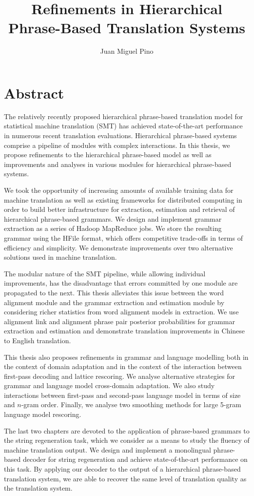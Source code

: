\documentclass[oneside, 12pt]{article}
\title{Refinements in Hierarchical Phrase-Based Translation Systems}
\author{Juan Miguel Pino}
\date{}
\begin{document}
\maketitle

\vspace{-2.5cm}

\section*{Abstract}

The relatively recently proposed hierarchical phrase-based
translation model for statistical machine translation (SMT)
has achieved state-of-the-art performance
in numerous recent translation evaluations. Hierarchical phrase-based
systems comprise a pipeline of modules with complex interactions.
In this thesis, we propose refinements to the hierarchical
phrase-based model as well as improvements and analyses in various
modules for hierarchical phrase-based systems.

We took the opportunity of increasing amounts of available training
data for machine translation as well as existing frameworks for
distributed computing in order to build better infrastructure
for extraction, estimation and retrieval of hierarchical phrase-based
grammars. We design and implement grammar extraction as a series of
Hadoop MapReduce jobs. We store the resulting grammar using the HFile
format, which
offers competitive trade-offs in terms of efficiency and simplicity.
We demonstrate improvements over two alternative solutions used in
machine translation.

The modular nature of the SMT pipeline, while allowing individual
improvements, has the disadvantage that errors committed by
one module are propagated to the next. This thesis
alleviates this issue between the word alignment module and the
grammar extraction and estimation module by considering richer
statistics from word alignment models in extraction. We use
alignment link and alignment phrase pair posterior probabilities
for grammar extraction and estimation and demonstrate translation
improvements in Chinese to English translation.

This thesis also proposes refinements in grammar and language
modelling both in the context of domain adaptation and in the
context of the interaction between first-pass decoding and
lattice rescoring. We analyse alternative strategies for grammar
and language model cross-domain adaptation. We also
study interactions between first-pass and second-pass language
model in terms of size and $n$-gram order. Finally, we
analyse two smoothing methods for large 5-gram language model
rescoring.

The last two chapters are devoted to the application of
phrase-based grammars to the string regeneration task, which
we consider as a means to study
the fluency of machine translation output.
We design and implement a monolingual phrase-based decoder
for string regeneration and achieve state-of-the-art
performance on this task. By applying our decoder
to the output of a hierarchical phrase-based translation system, we
are able to recover the same level of translation quality as
the translation system.
\end{document}
